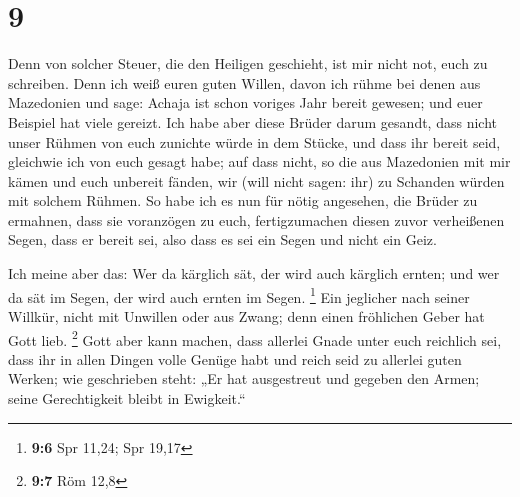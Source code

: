 \hypertarget{section-4}{%
\section{9}\label{section-4}}

 Denn von solcher Steuer, die den Heiligen geschieht, ist
mir nicht not, euch zu schreiben.  Denn ich weiß euren
guten Willen, davon ich rühme bei denen aus Mazedonien und sage: Achaja
ist schon voriges Jahr bereit gewesen; und euer Beispiel hat viele
gereizt.  Ich habe aber diese Brüder darum gesandt, dass
nicht unser Rühmen von euch zunichte würde in dem Stücke, und dass ihr
bereit seid, gleichwie ich von euch gesagt habe;  auf dass
nicht, so die aus Mazedonien mit mir kämen und euch unbereit fänden, wir
(will nicht sagen: ihr) zu Schanden würden mit solchem Rühmen.
 So habe ich es nun für nötig angesehen, die Brüder zu
ermahnen, dass sie voranzögen zu euch, fertigzumachen diesen zuvor
verheißenen Segen, dass er bereit sei, also dass es sei ein Segen und
nicht ein Geiz.

 Ich meine aber das: Wer da kärglich sät, der wird auch
kärglich ernten; und wer da sät im Segen, der wird auch ernten im Segen.
\footnote{\textbf{9:6} Spr 11,24; Spr 19,17}  Ein
jeglicher nach seiner Willkür, nicht mit Unwillen oder aus Zwang; denn
einen fröhlichen Geber hat Gott lieb. \footnote{\textbf{9:7} Röm 12,8}
 Gott aber kann machen, dass allerlei Gnade unter euch
reichlich sei, dass ihr in allen Dingen volle Genüge habt und reich seid
zu allerlei guten Werken;  wie geschrieben steht: „Er hat
ausgestreut und gegeben den Armen; seine Gerechtigkeit bleibt in
Ewigkeit.``

